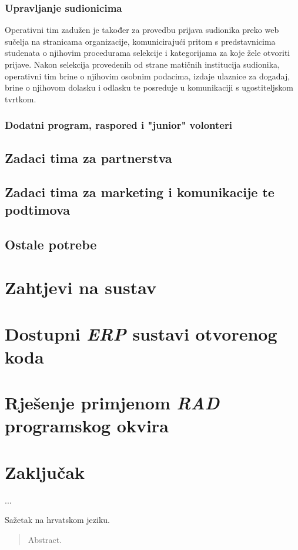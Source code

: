 \documentclass[times, utf8, diplomski]{fer}
\begin{document}
\subsection{Upravljanje sudionicima}

Operativni tim zadužen je također za provedbu prijava sudionika preko web
sučelja na stranicama organizacije, komunicirajući pritom s predstavnicima
studenata o njihovim procedurama selekcije i kategorijama za koje žele otvoriti
prijave. Nakon selekcija provedenih od strane matičnih institucija sudionika,
operativni tim brine o njihovim osobnim podacima, izdaje ulaznice za događaj,
brine o njihovom dolasku i odlasku te posreduje u komunikaciji s ugostiteljskom
tvrtkom.

\subsection{Dodatni program, raspored i "junior" volonteri}

\section{Zadaci tima za partnerstva}
\section{Zadaci tima za marketing i komunikacije te podtimova}
\section{Ostale potrebe}

\chapter{Zahtjevi na sustav}
\chapter{Dostupni \emph{ERP} sustavi otvorenog koda}
\chapter{Rješenje primjenom \emph{RAD} programskog okvira}

\chapter{Zaključak}
...



\begin{sazetak}
Sažetak na hrvatskom jeziku.

\end{sazetak}

\begin{abstract}
Abstract.

\end{abstract}
\end{document}
